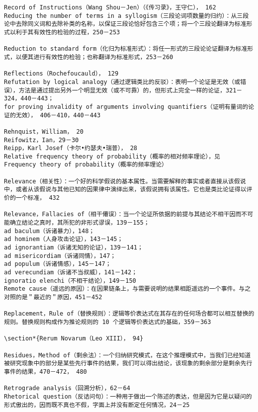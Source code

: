 \begin{verbatim}
Record of Instructions（Wang Shou－Jen）（《传习录》，王守仁）， 162
Reducing the number of terms in a syllogism（三段论词项数量的归约）：从三段论中去除同义词和去除补类的名称，以保证三段论恰好包含三个项；将一个三段论翻译为标准形式以利于其有效性的检验的过程，250－253

Reduction to standard form（化归为标准形式）：将任一形式的三段论论证翻译为标准形式，以便其进行有效性的检验；也称翻译为标准形式，253－260

Reflections（Rochefoucauld）， 129
Refutation by logical analogy（通过逻辑类比的反驳）：表明一个论证是无效（或错误），方法是通过提出另外一个明显无效（或不可靠）的，但形式上完全一样的论证，321－324，440－443；
for proving invalidity of arguments involving quantifiers（证明有量词的论证的无效）， 406－410，440－443

Rehnquist，William， 20
Reifowitz，Ian，29－30
Reipp，Karl Josef（卡尔•约瑟夫•瑞普）， 28
Relative frequency theory of probability（概率的相对频率理论），见 Frequency theory of probability（概率的频率理论）

Relevance（相关性）：一个好的科学假说的基本属性。当需要解释的事实或者直接从该假说中，或者从该假说与其他已知的因果律中演绎出来，该假说拥有该属性。它也是类比论证得以评价的一个标准， 432

Relevance，Fallacies of（相干僊误）：当一个论证所依据的前提与其结论不相干因而不可能确立结论之真时，其所犯的非形式谬误，139－155；
ad baculum（诉诸暴力），148；
ad hominem（人身攻击论证），143－145；
ad ignorantiam（诉诸无知的论证），139－141；
ad misericordiam（诉诸同情），147；
ad populum（诉诸情感），145－147；
ad verecundiam（诉诸不当叔威），141－142；
ignoratio elenchi（不相干结论），149－150
Remote cause（遥远的原因）：在因果链条上，与需要说明的结果相距遥远的一个事件。与之对照的是＂最近的＂原因，451－452

Replacement，Rule of（替换规则）：逻辑等价表达式在其存在的任何场合都可以相互替换的规则。替换规则构成作为推论规则的 10 个逻辑等价表达式的基础，359－363

\section*{Rerum Novarum（Leo XIII）， 94}

Residues，Method of（剩余法）：一个归纳研究模式，在这个推理模式中，当我们已经知道被研究现象中的部分是某些先行事件的结果，我们可以得出结论，该现象的剩余部分是剩余先行事件的结果，470－472， 480

Retrograde analysis（回溯分析），62－64
Rhetorical question（反诘问句）：一种用于做出一个陈述的表达，但是因为它是以疑问的形式傲出的，因而既不真也不假，字面上并没有断定任何情况，24－25


\end{verbatim}
